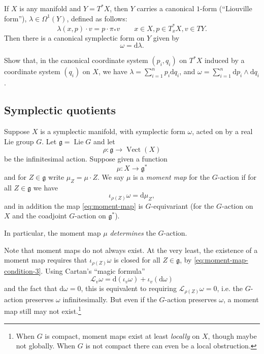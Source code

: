 \documentclass[12pt,letterpaper,reqno]{article}
\numberwithin{equation}{section}
\newcommand{\fg}{{\mathfrak g}}
\newcommand{\cL}{\ensuremath{\mathcal L}}
\newcommand{\de}{\mathrm{d}}
\newcommand{\ti}[1]{\textit{#1}}
\DeclareMathOperator{\Lie}{Lie}
\DeclareMathOperator{\Vect}{Vect}
\begin{document}
\begin{example}
If $X$ is any manifold and $Y = T^* X$, then $Y$ carries a canonical
$1$-form (``Liouville form''), $\lambda \in \Omega^1(Y)$,
defined as follows:
\begin{equation}
  \lambda(x,p) \cdot v = p \cdot \pi_* v \qquad x \in X, p \in T^*_x X, v \in TY.
\end{equation}
Then there is a canonical symplectic form on $Y$ given by
\begin{equation}
\omega = \de \lambda.
\end{equation}
\end{example}

\begin{exercise}
Show that, in the canonical coordinate system $(p_i,q_i)$
on $T^* X$ induced by a coordinate system $(q_i)$ on $X$,
we have
$\lambda = \sum_{i=1}^n p_i \de q_i$, and
$\omega = \sum_{i=1}^n \de p_i \wedge \de q_i$.
\end{exercise}


\subsection{Symplectic quotients}

\begin{defn} \label{def:moment-map}
Suppose $X$ is a symplectic manifold, with symplectic form $\omega$,
acted on by a real Lie group $G$. Let $\fg = \Lie G$ and let
\begin{equation}
\rho: \fg \to \Vect(X)
\end{equation}
be the infinitesimal action.
Suppose given a function
\begin{equation} \label{eq:moment-map}
 \mu: X \to \fg^*
\end{equation}
and for $Z \in \fg$ write $\mu_Z = \mu \cdot Z$.
We say $\mu$ is a \ti{moment map} for the $G$-action if
for all $Z \in \fg$ we have
\begin{equation} \label{eq:moment-map-condition-3}
  \iota_{\rho(Z)} \omega = \de \mu_Z,
\end{equation}
and in addition the map \eqref{eq:moment-map} is $G$-equivariant
(for the $G$-action on $X$ and the coadjoint $G$-action on $\fg^*$).
\end{defn}
In particular, the moment map $\mu$
\ti{determines} the $G$-action.

Note that moment maps do not always exist.
At the very least, the existence of a moment
map requires that $\iota_{\rho(Z)} \omega$ is closed
for all $Z \in \fg$, by \eqref{eq:moment-map-condition-3}. Using
Cartan's ``magic formula''
\begin{equation} \label{eq:cartan-magic-formula}
  \cL_v \omega = \de (\iota_v \omega) + \iota_v (\de \omega)
\end{equation}
and the fact that $\de \omega = 0$,
this is equivalent to requiring $\cL_{\rho(Z)}\omega = 0$,
i.e. the $G$-action preserves $\omega$ infinitesimally.
But even if the $G$-action preserves $\omega$,
a moment map still may not exist.\footnote{When $G$ is compact,
moment maps exist at least
\ti{locally} on $X$, though maybe not globally. When $G$ is not
compact there can even be a local obstruction.}
\end{document}
